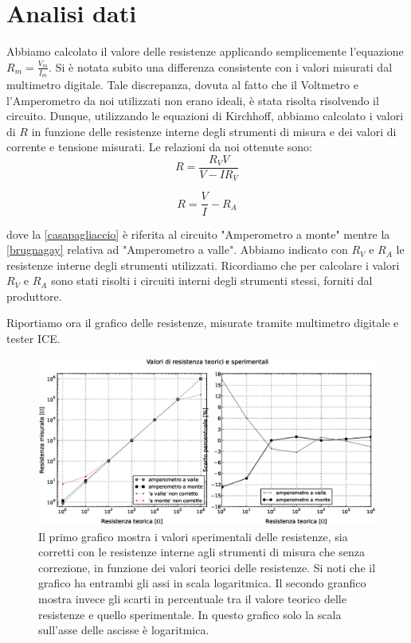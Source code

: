 \section{Analisi dati}

Abbiamo calcolato il valore delle resistenze applicando semplicemente l'equazione $R_m=\frac{V_m}{I_m}$. Si è notata subito una differenza consistente con i valori misurati dal multimetro digitale. Tale discrepanza, dovuta al fatto che il Voltmetro e l'Amperometro da noi utilizzati non erano ideali, è stata risolta risolvendo il circuito. Dunque, utilizzando le equazioni di Kirchhoff, abbiamo calcolato i valori di $R$ in funzione delle resistenze interne degli strumenti di misura e dei valori di corrente e tensione misurati. Le relazioni da noi ottenute sono:
\begin{equation}
R=\frac{R_VV}{V-IR_V}
\label{casapagliaccio}
\end{equation} 

\begin{equation}
R=\frac{V}{I}-R_A
\label{brugnagay}
\end{equation} 

dove la \ref{casapagliaccio} è riferita al circuito "Amperometro a monte" mentre la \ref{brugnagay} relativa ad "Amperometro a valle". Abbiamo indicato con $R_V$ e $R_A$ le resistenze interne degli strumenti utilizzati. 
Ricordiamo che per calcolare i valori $R_V$ e $R_A$ sono stati risolti i circuiti interni degli strumenti stessi, forniti dal produttore. 

Riportiamo ora il grafico delle resistenze, misurate tramite multimetro digitale e tester ICE. 

\begin{figure}[t]
    \centering
        \includegraphics[width=\textwidth]{Res.eps}
        \caption{Il primo grafico mostra i valori sperimentali delle resistenze, sia corretti con le resistenze interne agli strumenti di misura che senza correzione, in funzione dei valori teorici delle resistenze. Si noti che il grafico ha entrambi gli assi in scala logaritmica. Il secondo granfico mostra invece gli scarti in percentuale tra il valore teorico delle resistenze e quello sperimentale. In questo grafico solo la scala sull'asse delle ascisse è logaritmica.}
        \label{fig:resistenze}
\end{figure}


